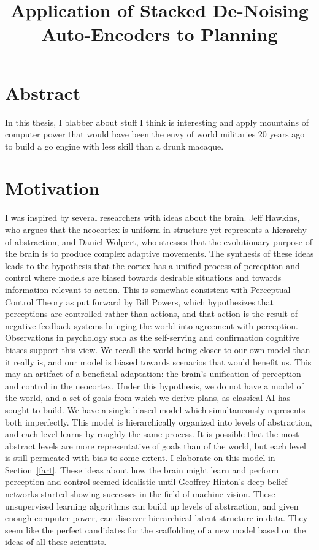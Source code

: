 \documentclass[12pt]{article}
\begin{document}
         

\section{Abstract}
\label{Abstract}
\doublespacing

In this thesis, I blabber about stuff I think is interesting and apply mountains of computer power that would have been the envy of world militaries 20 years ago to build a go engine with less skill than a drunk macaque.

\title{Application of Stacked De-Noising Auto-Encoders to Planning}
\section{Motivation}

I was inspired by several researchers with ideas about the brain. Jeff Hawkins, who argues that the neocortex is uniform in structure yet represents a hierarchy of abstraction, and Daniel Wolpert, who stresses that the evolutionary purpose of the brain is to produce complex adaptive movements. The synthesis of these ideas leads to the hypothesis that the cortex has a unified process of perception and control where models are biased towards desirable situations and towards information relevant to action. This is somewhat consistent with Perceptual Control Theory as put forward by Bill Powers, which hypothesizes that perceptions are controlled rather than actions, and that action is the result of negative feedback systems bringing the world into agreement with perception. Observations in psychology such as the self-serving and confirmation cognitive biases support this view. We recall the world being closer to our own model than it really is, and our model is biased towards scenarios that would benefit us. This may an artifact of a beneficial adaptation: the brain's unification of perception and control in the neocortex. Under this hypothesis, we do not have a model of the world, and a set of goals from which we derive plans, as classical AI has sought to build. We have a single biased model which simultaneously represents both imperfectly. This model is hierarchically organized into levels of abstraction, and each level learns by roughly the same process. It is possible that the most abstract levels are more representative of goals than of the world, but each level is still permeated with bias to some extent. I elaborate on this model in Section~\ref{fart}. These ideas about how the brain might learn and perform perception and control seemed idealistic until Geoffrey Hinton's deep belief networks started showing successes in the field of machine vision. These unsupervised learning algorithms can build up levels of abstraction, and given enough computer power, can discover hierarchical latent structure in data. They seem like the perfect candidates for the scaffolding of a new model based on the ideas of all these scientists. 
 
\end{document}
